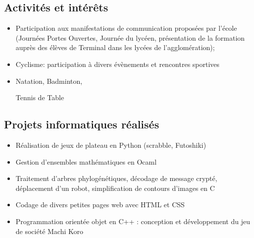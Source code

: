 \documentclass[9pt, oneside, a4paper, titlepage]{extarticle}
\begin{document}
\begin{tcolorbox}
\begin{minipage}[t]{6.2cm}
\begin{spacing}{0.95}
\begin{tcolorbox}[grow to left by = 0.6cm, colback = gray!25, colframe = white]
                \vspace*{0.2cm}
                \section*{Activités et intérêts}

                \begin{itemize}
                    \vspace*{0.3cm}
                    \item Participation aux manifestations de communication proposées par l’école (Journées Portes Ouvertes, Journée du lycéen, présentation de la formation auprès des élèves de Terminal dans les lycées de l’agglomération);
                    \vspace*{0.1cm}
                    \item Cyclisme: participation à divers évènements et rencontres sportives
                    \vspace*{0.1cm}
                    \item Natation, Badminton, 
                    
                    Tennis de Table
                    
                \end{itemize}

            \end{tcolorbox}
        \end{spacing}
        \end{minipage}
        \hspace*{0.4mm}
        \begin{minipage}[t]{12.8cm}
            \vspace*{-0.5cm}
            \begin{tcolorbox}[grow to right by = 0.6cm, colback = gray!25, colframe = white]
                \section*{Projets informatiques réalisés}
                \begin{itemize}
                    \item Réalisation de jeux de plateau en Python (scrabble, Futoshiki)
                    \item Gestion d’ensembles mathématiques en Ocaml
                    \item Traitement d’arbres phylogénétiques, décodage de message crypté, déplacement d’un robot, simplification de contours d’images en C
                    \item Codage de divers petites pages web avec HTML et CSS
                    \item Programmation orientée objet en C++ : conception et développement du jeu de société Machi Koro


\end{itemize}
\end{tcolorbox}
\end{minipage}
\end{tcolorbox}
\end{document}
